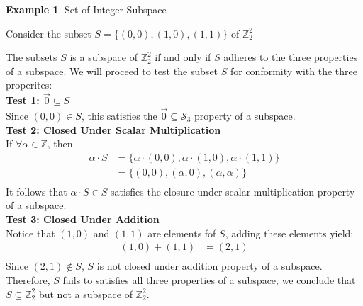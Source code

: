 \documentclass{book}
\theoremstyle{definition}
\newtheorem{example}{Example}[definition]
\theoremstyle{remark}
\newcommand{\bb}[1]{\mathbb{#1}}
\newcommand{\cc}[1]{\mathcal{#1}}
\newcommand{\m}{\cdot}
\begin{document}
\begin{example}
Set of Integer Subspace

    \begin{tcolorbox}
        Consider the subset $S = \{ (0,0), (1,0), (1,1) \}$ of $\bb{Z}_2^2$
    \end{tcolorbox}
        The subsets $S$ is a subspace of $\bb{Z}_2^2$ if and only if $S$ adheres to the three properties of a subspace. We will proceed to test the subset $S$ for conformity with the three properites: \\
    
        \textbf{Test 1: $\vec{0} \subseteq S$} \\
            Since $(0,0) \in S$, this satisfies the $\vec{0} \subseteq \cc{S}_3$ property of a subspace. \\
            
        \textbf{Test 2: Closed Under Scalar Multiplication} \\
            If $\forall \alpha \in \bb{Z}$, then  
                \begin{align*}
                    \alpha \m S & = \{ \alpha \m (0,0), \alpha \m (1,0), \alpha \m (1,1) \} \\
                        & = \{ (0,0), (\alpha, 0), (\alpha, \alpha) \} \\
                \end{align*}
            It follows that $\alpha \m S \in S$ satisfies the closure under scalar multiplication property of a subspace. \\
        
        \textbf{Test 3: Closed Under Addition} \\
            Notice that $(1,0)$ and $(1,1)$ are elements fof $S$, adding these elements yield: \\
                \begin{align*}
                    (1,0) + (1,1) & = (2,1) \\
                \end{align*}
            Since $(2,1) \notin S$, $S$ is not closed under addition property of a subspace. \\
        
        Therefore, $S$ fails to satisfies all three properties of a subspace, we conclude that $S \subseteq \bb{Z}_2^2$ but not a subspace of $\bb{Z}_2^2$.
\end{example}
\end{document}
